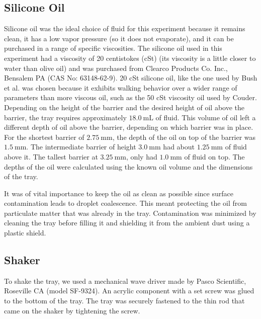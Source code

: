 \subsection{Silicone Oil}
    Silicone oil was the ideal choice of fluid for this experiment because it remains clean, it has a low vapor pressure (so it does not evaporate), and it can be purchased in a range of specific viscosities. The silicone oil used in this experiment had a viscosity of 20 centistokes (cSt) (its viscosity is a little closer to water than olive oil) and was purchased from Clearco Products Co. Inc., Bensalem PA (CAS No: 63148-62-9). 20 cSt silicone oil, like the one used by Bush et al. was chosen because it exhibits walking behavior over a wider range of parameters than more viscous oil, such as the 50 cSt viscosity oil used by Couder. Depending on the height of the barrier and the desired height of oil above the barrier, the tray requires approximately $18.0~\mathrm{mL}$ of fluid. This volume of oil left a different depth of oil above the barrier, depending on which barrier was in place. For the shortest barrier of $2.75~\mathrm{mm}$, the depth of the oil on top of the barrier was $1.5~\mathrm{mm}$. The intermediate barrier of height $3.0~\mathrm{mm}$ had about $1.25~\mathrm{mm}$ of fluid above it. The tallest barrier at $3.25~\mathrm{mm}$, only had $1.0~\mathrm{mm}$ of fluid on top. The depths of the oil were calculated using the known oil volume and the dimensions of the tray.
    
    It was of vital importance to keep the oil as clean as possible since surface contamination leads to droplet coalescence. This meant protecting the oil from particulate matter that was already in the tray. Contamination was minimized by cleaning the tray before filling it and shielding it from the ambient dust using a plastic shield.
    
\subsection{Shaker}
    To shake the tray, we used a mechanical wave driver made by Pasco Scientific, Roseville CA (model SF-9324). An acrylic component with a set screw was glued to the bottom of the tray. The tray was securely fastened to the thin rod that came on the shaker by tightening the screw.
    
